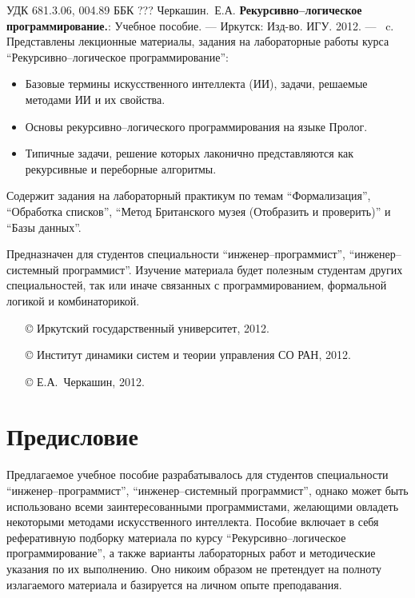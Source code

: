 \documentclass[12pt, openany, twoside]{book} %
\newenvironment{mygroup}{}{}
\begin{document}
\newpage
\begin{mygroup}
\thispagestyle{empty}
\noindent УДК 681.3.06, 004.89 ББК ???
\vfill%
{Черкашин.~Е.А.} {\bf Рекурсивно--логическое программирование.}: Учебное пособие. ---
Иркутск: Изд-во. ИГУ. 2012. --- \pageref{pg:lastpage}~c.
\vfill
Представлены лекционные материалы, задания на лабораторные работы курса
``Рекурсивно--логическое программирование'':
\begin{itemize}
\item Базовые термины искусственного интеллекта (ИИ), задачи, решаемые методами
ИИ и их свойства.
\item Основы рекурсивно--логического программирования на языке Пролог.
\item Типичные задачи, решение которых лаконично представляются как рекурсивные и переборные алгоритмы.
\end{itemize}
Содержит задания на лабораторный практикум по темам ``Формализация'',
``Обработка списков'', ``Метод Британского музея (Отобразить и проверить)'' и ``Базы данных''.

    Предназначен для студентов специальности
``инженер--программист'', ``инженер--системный программист''.
Изучение материала будет полезным студентам других специальностей, так или иначе связанных с программированием, формальной логикой и комбинаторикой.

\vfill\vfill

\vfill
\hbox{}\hfill
\begin{minipage}{0.6\linewidth}
\begin{itemize}
\setlength{\itemsep}{0pt}
\setlength{\parsep}{0pt}
\item[\copyright{}] Иркутский государственный университет, 2012.\item[\copyright{}] Институт динамики систем и теории управления СО РАН, 2012.
\item[\copyright{}] Е.А.~Черкашин, 2012.
\end{itemize}
\end{minipage}
\end{mygroup}
\tableofcontents
\clearpage

\newpage
\section*{Предисловие}
\thispagestyle{empty}

Предлагаемое учебное пособие разрабатывалось для студентов специальности ``инженер--программист'', ``инженер--системный
программист'', однако может быть использовано всеми заинтересованными программистами, желающими овладеть некоторыми методами искусственного интеллекта. Пособие включает в себя рефе\-ра\-тив\-ную подборку материала по курсу ``Рекурсивно--логическое программирование'', а также варианты лабораторных работ и методические указания по их выполнению. Оно никоим образом не претендует на полноту излагаемого материала и базируется на личном опыте преподавания.
\end{document}
